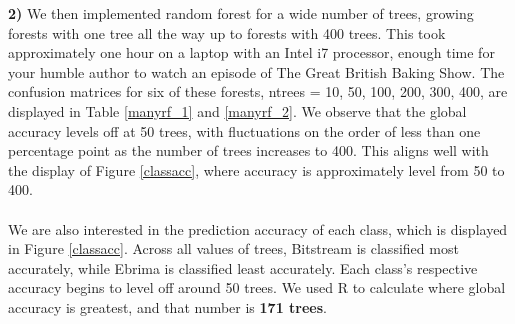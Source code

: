 \documentclass{homework}
\begin{document}
\textbf{2)} We then implemented random forest for a wide number of trees, growing forests with one tree all the way up to forests with 400 trees. This took approximately one hour on a laptop with an Intel i7 processor, enough time for your humble author to watch an episode of The Great British Baking Show. The confusion matrices for six of these forests, ntrees = {10, 50, 100, 200, 300, 400}, are displayed in Table \ref{manyrf_1} and \ref{manyrf_2}. We observe that the global accuracy levels off at 50 trees, with fluctuations on the order of less than one percentage point as the number of trees increases to 400. This aligns well with the display of Figure \ref{classacc}, where accuracy is approximately level from 50 to 400.\\\\We are also interested in the prediction accuracy of each class, which is displayed in Figure \ref{classacc}. Across all values of trees, Bitstream is classified most accurately, while Ebrima is classified least accurately. Each class's respective accuracy begins to level off around 50 trees. We used R to calculate where global accuracy is greatest, and that number is \textbf{171 trees}.

\begin{table}[H]
    \centering
    \\
    \\
             \\
    \caption{Testing Set Confusion Matrices for Different Numbers of Trees}
    \label{manyrf_1}
\end{table}
\end{document}
